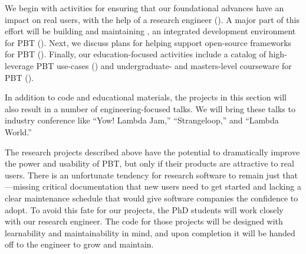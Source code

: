 We begin with activities for ensuring that our foundational
advances have an impact on real users, with the help of a research
engineer (). A major part of this
effort will be
building and maintaining \tyche, an integrated development environment for PBT
(). Next, we discuss plans for helping
support open-source frameworks for PBT ().
Finally, our
education-focused activities include a catalog of high-leverage PBT
use-cases () and undergraduate- and
masters-level courseware for PBT
().

In addition to code and educational materials, the projects in this section will
also result in a number of engineering-focused talks. We will bring these talks
to industry conference like ``Yow! Lambda Jam,'' ``Strangeloop,'' and
``Lambda World.''


%
The research projects described above have the potential to
dramatically improve the power and usability of PBT, but only
if their products are attractive to real users. There is an unfortunate tendency for
research software to remain just that---missing critical
documentation that new users need to get started and lacking a clear
maintenance schedule that would give software companies the confidence
to adopt.
To avoid this fate for our projects, the PhD students will work closely with our
research engineer. The code for those projects will be designed with learnability and
maintainability in mind, and upon
completion it will be handed off to the
engineer to grow and maintain.


